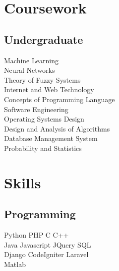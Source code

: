 \documentclass[]{deedy-resume-openfont}
\begin{document}
\begin{minipage}[t]{0.33\textwidth}

\section{Coursework}
\subsection{Undergraduate}
Machine Learning \\
Neural Networks \\
Theory of Fuzzy Systems \\
Internet and Web Technology \\
Concepts of Programming Language\\
Software Engineering \\
Operating Systems Design \\
Design and Analysis of Algorithms \\
Database Management System \\
Probability and Statistics \\
\sectionsep



\section{Skills}
\subsection{Programming}
Python \textbullet{} PHP \textbullet{} C \textbullet{}C++  \\
Java \textbullet{} Javascript \textbullet{} JQuery \textbullet{} SQL \\
Django \textbullet{} CodeIgniter \textbullet{} Laravel  \\ 

 \textbullet{} Matlab
\sectionsep

%
%

\end{minipage} 
\end{document}
